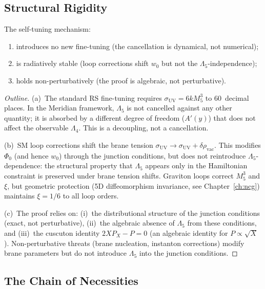 \subsection{Structural Rigidity}
\label{sec:3-vnogo-rigid}

\begin{proposition}
\label{thm:vnogo-rigid}
The self-tuning mechanism:
\begin{enumerate}
  \item[\emph{(a)}] introduces no new fine-tuning (the cancellation is dynamical, not numerical);
  \item[\emph{(b)}] is radiatively stable (loop corrections shift $w_0$ but not the $\Lambda_5$-independence);
  \item[\emph{(c)}] holds non-perturbatively (the proof is algebraic, not perturbative).
\end{enumerate}
\end{proposition}

\begin{proof}[Outline]
(a)~The standard RS fine-tuning requires $\sigma_{\mathrm{UV}} = 6kM_5^3$ to 60~decimal places. In the Meridian framework, $\Lambda_5$ is not cancelled against any other quantity; it is absorbed by a different degree of freedom ($A'(y)$) that does not affect the observable $\Lambda_4$. This is a decoupling, not a cancellation.

(b)~SM loop corrections shift the brane tension $\sigma_{\mathrm{UV}} \to \sigma_{\mathrm{UV}} + \delta\rho_{\mathrm{vac}}$. This modifies $\Phi_0$ (and hence $w_0$) through the junction conditions, but does not reintroduce $\Lambda_5$-dependence: the structural property that $\Lambda_5$ appears only in the Hamiltonian constraint is preserved under brane tension shifts. Graviton loops correct $M_5^3$ and $\xi$, but geometric protection (5D diffeomorphism invariance, see Chapter~\ref{ch:ncg}) maintains $\xi = 1/6$ to all loop orders.

(c)~The proof relies on: (i)~the distributional structure of the junction conditions (exact, not perturbative), (ii)~the algebraic absence of $\Lambda_5$ from these conditions, and (iii)~the cuscuton identity $2XP_X - P = 0$ (an algebraic identity for $P \propto \sqrt{X}$). Non-perturbative threats (brane nucleation, instanton corrections) modify brane parameters but do not introduce $\Lambda_5$ into the junction conditions.
\end{proof}

\subsection{The Chain of Necessities}
\label{sec:3-vnogo-chain}

